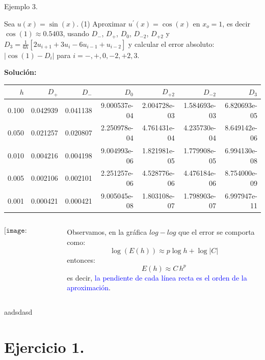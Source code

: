 \documentclass{beamer}
\begin{document}
\begin{frame}

\begin{block}{Ejemplo 3.}
{\scriptsize 
Sea $u(x) = \sin(x)$. (1) Aproximar $u^{\prime}(x) = \cos(x)$ en $x_o = 1$, es decir $\cos(1) \approx 0.5403$, 
usando $D_-$, $D_+$, $D_0$, $D_{-2}$, $D_{+2}$ y $D_3  = \frac{1}{6h}[2u_{i+1} + 3u_i - 6u_{i-1} + u_{i-2}]$ 
y calcular el error absoluto: $|\cos(1) - D_i|$ para $i= -, + , 0, -2, +2, 3$.
%

\textbf{Solución:}}
{\tiny 
\begin{tabular}{rrrrrrr}
	\toprule
	$h$ &     $D_+$ &     $D_-$ &    $D_0$ &      $D_{+2}$ &   $D_{-2}$ &         $D_3$ \\
	\midrule
	0.100 &  0.042939 &  0.041138 &  9.000537e-04 &  2.004728e-03 &  1.584693e-03 &  6.820693e-05 \\
	0.050 &  0.021257 &  0.020807 &  2.250978e-04 &  4.761431e-04 &  4.235730e-04 &  8.649142e-06 \\
	0.010 &  0.004216 &  0.004198 &  9.004993e-06 &  1.821981e-05 &  1.779908e-05 &  6.994130e-08 \\
	0.005 &  0.002106 &  0.002101 &  2.251257e-06 &  4.528776e-06 &  4.476184e-06 &  8.754000e-09 \\
	0.001 &  0.000421 &  0.000421 &  9.005045e-08 &  1.803108e-07 &  1.798903e-07 &  6.997947e-11 \\
	\bottomrule
\end{tabular}}
%
\begin{columns}
\begin{column}{0.50\textwidth}
$$\texttt{[image: LogLogFDM]}$$
\end{column}
\begin{column}{0.45\textwidth}
{\scriptsize Observamos, en la gráfica $log-log$ que el error se comporta como:
$$\log(E(h)) \approx p \log h + \log|C|$$
entonces: 
$$E(h) \approx C \, h^p$$
es decir, \textcolor{blue}{la pendiente de cada l\'inea recta es el orden de la aproximaci\'on}}.
\end{column}
\end{columns}

aadsdasd

\end{block}

\end{frame}

\section{Ejercicio 1.}
\end{document}
